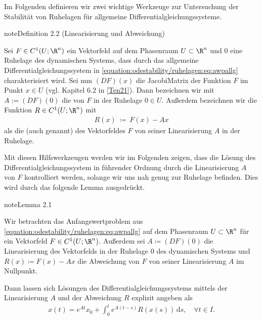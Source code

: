 \documentclass[letterpaper,10pt,english]{jupyterBook}
\begin{document}
\sphinxAtStartPar
Im Folgenden definieren wir zwei wichtige Werkzeuge zur Untersuchung der Stabilität von Ruhelagen für allgemeine Differentialgleichungssysteme.
\label{odestability/ruhelagen:def:linearisierung}
\begin{sphinxadmonition}{note}{Definition 2.2 (Linearisierung und Abweichung)}



\sphinxAtStartPar
Sei \(F\in C^1(U;\R^n)\) ein Vektorfeld auf dem Phasenraum \(U \subset \R^n\) und \(0\) eine Ruhelage des dynamischen Systems, dass durch das allgemeine Differentialgleichungssystem in \eqref{equation:odestability/ruhelagen:eq:awpallg} charakterisiert wird.
Sei nun \((DF)(x)\) die Jacobi\sphinxhyphen{}Matrix der Funktion \(F\) im Punkt \(x \in U\) (vgl. Kapitel 6.2 in {[}\hyperlink{cite.references:id12}{Ten21}{]}).
Dann bezeichnen wir mit \(A := (DF)(0)\) die  von \(F\) in der Ruhelage \(0 \in U\).
Außerdem bezeichnen wir die Funktion \(R \in C^1(U; \R^n)\) mit
\begin{equation*}
\begin{split}R(x) \ \coloneqq \ F(x) - Ax\end{split}
\end{equation*}
\sphinxAtStartPar
als die  (auch  genannt) des Vektorfeldes \(F\) von seiner Linearisierung \(A\) in der Ruhelage.
\end{sphinxadmonition}

\sphinxAtStartPar
Mit diesen Hilfswerkzeugen werden wir im Folgenden zeigen, dass die Lösung des Differentialgleichungssystem in führender Ordnung durch die Linearisierung \(A\) von \(F\) kontrolliert werden, solange wir uns nah genug zur Ruhelage befinden. Dies wird durch das folgende Lemma ausgedrückt.
\label{odestability/ruhelagen:lem:intexpglgn}
\begin{sphinxadmonition}{note}{Lemma 2.1}



\sphinxAtStartPar
Wir betrachten das Anfangswertproblem aus \eqref{equation:odestability/ruhelagen:eq:awpallg} auf dem Phasenraum \(U \subset \R^n\) für ein Vektorfeld \(F\in C^1(U;\R^n)\).
Außerdem sei \(A \coloneqq (DF)(0)\) die Linearisierung des Vektorfelds in der Ruhelage \(0\) des dynamischen Systems und \(R(x) \coloneqq F(x) - Ax\) die Abweichung von \(F\) von seiner Linearisierung \(A\) im Nullpunkt.

\sphinxAtStartPar
Dann lassen sich Lösungen des Differentialgleichungssystems mittels der Linearisierung \(A\) und der Abweichung \(R\) explizit angeben als
\begin{equation*}
\begin{split}x(t) = e^{At}x_0 + \int_0^t e^{A(t-s)} R(x(s))\, \mathrm{d}s, \quad \forall t \in I.\end{split}
\end{equation*}\end{sphinxadmonition}
\end{document}
